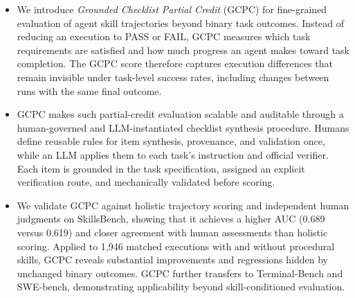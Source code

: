 \documentclass[sigconf,nonacm]{acmart}
\begin{document}
\begin{itemize}
\item We introduce \emph{Grounded Checklist Partial Credit} (GCPC)
for fine-grained evaluation of agent skill trajectories beyond binary task outcomes.
Instead of reducing an execution to PASS or FAIL, GCPC measures which task
requirements are satisfied and how much progress an agent makes toward task
completion. The GCPC score therefore captures execution differences that remain invisible under task-level success rates, including changes between runs with the same final outcome.
\item GCPC makes such partial-credit evaluation scalable and auditable through
a human-governed and LLM-instantiated checklist synthesis procedure. Humans define reusable rules for item synthesis, provenance, and validation once, while an LLM applies them to each task's instruction and official verifier. Each item is grounded in the task specification, assigned an explicit verification route, and mechanically validated before scoring.
\item We validate GCPC against holistic trajectory scoring and independent human judgments on SkillsBench, showing that it achieves a higher AUC (0.689 versus 0.619) and closer agreement with human assessments than holistic scoring. Applied to 1{,}946 matched executions with and without procedural skills, GCPC reveals substantial improvements and regressions hidden by unchanged binary outcomes. GCPC further transfers to Terminal-Bench and SWE-bench, demonstrating applicability beyond skill-conditioned evaluation.
\end{itemize}
\end{document}

